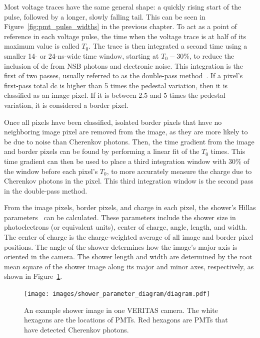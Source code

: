 Most voltage traces have the same general shape: a quickly rising start of the pulse, followed by a longer, slowly falling tail.
This can be seen in Figure~\ref{fig:pmt_pulse_widths} in the previous chapter.
To act as a point of reference in each voltage pulse, the time when the voltage trace is at half of its maximum value is called $T_{0}$.
The trace is then integrated a second time using a smaller 14- or 24-ns-wide time window, starting at $T_0 - 30\%$, to reduce the inclusion of dc from NSB photons and electronic noise.
This integration is the first of two passes, usually referred to as the double-pass method~\cite{doublepass}.
If a pixel's first-pass total dc is higher than 5 times the pedestal variation, then it is classified as an image pixel.
If it is between 2.5 and 5 times the pedestal variation, it is considered a border pixel.

Once all pixels have been classified, isolated border pixels that have no neighboring image pixel are removed from the image, as they are more likely to be due to noise than Cherenkov photons.
Then, the time gradient from the image and border pixels can be found by performing a linear fit of the $T_{0}$ times.
This time gradient can then be used to place a third integration window 
with 30\% of the window before each pixel's $T_{0}$, to more accurately measure the charge due to Cherenkov photons in the pixel.
This third integration window is the second pass in the double-pass method.

From the image pixels, border pixels, and charge in each pixel, the shower's Hillas parameters~\cite{hillas_params} can be calculated.
These parameters include the shower size in photoelectrons (or equivalent units), center of charge, angle, length, and width.
The center of charge is the charge-weighted average of all image and border pixel positions.
The angle of the shower determines how the image's major axis is oriented in the camera.
The shower length and width are determined by the root mean square of the shower image along its major and minor axes, respectively, as shown in Figure~\ref{fig:shower_param}.
  
\begin{figure}[t]
  \centering
  \texttt{[image: images/shower\_parameter\_diagram/diagram.pdf]}
  \caption[Basic Shower Diagram]{
    An example shower image in one VERITAS camera.
    The white hexagons are the locations of PMTs.
    Red hexagons are PMTs that have detected Cherenkov photons.
  }
  \label{fig:shower_param}
\end{figure}
\FloatBarrier

